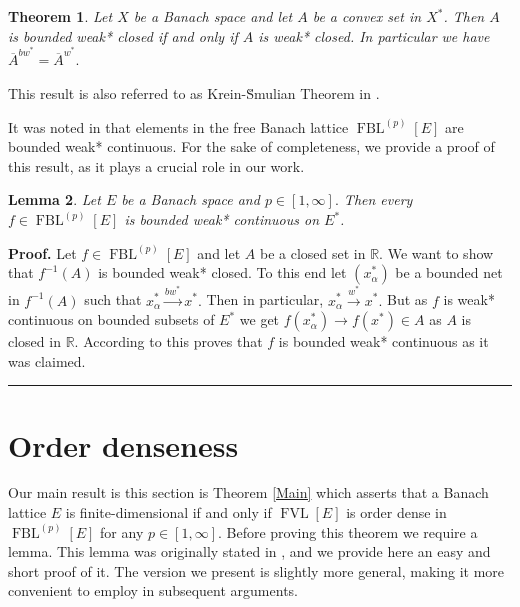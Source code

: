 \documentclass[12pt]{article}%
\newtheorem{theorem}{Theorem}
\newtheorem{lemma}[theorem]{Lemma}
\newenvironment{proof}[1][Proof]{\noindent\textbf{#1.} }{\ \rule{0.5em}{0.5em}}
\begin{document}
\begin{theorem}
\label{BD}Let $X$ be a Banach space \textit{and let} $A$ \textit{be a convex
set in} $X^{\ast}$. Then $A$ is bounded weak* closed if and only if $A$ is
weak* closed.\textit{ In particular we have }$\overline{A}^{bw^{\ast}%
}=\overline{A}^{w^{\ast}}.$
\end{theorem}

This result is also referred to as Krein-\u{S}mulian Theorem in
\cite[Corollary 8.47]{b-1901}.

It was noted in \cite{L-925} that elements in the free Banach lattice
$\operatorname*{FBL}\nolimits^{(p)}\left[  E\right]  $ are bounded weak*
continuous. For the sake of completeness, we provide a proof of this result,
as it plays a crucial role in our work.

\begin{lemma}
Let $E$ be a Banach space and $p\in\left[  1,\infty\right]  .$ Then every
$f\in\operatorname*{FBL}\nolimits^{(p)}\left[  E\right]  $ is bounded weak*
continuous on $E^{\ast}$.
\end{lemma}

\begin{proof}
Let $f\in\operatorname*{FBL}\nolimits^{(p)}\left[  E\right]  $ and let $A$ be
a closed set in $\mathbb{R}.$ We want to show that $f^{-1}\left(  A\right)  $
is bounded weak* closed. To this end let $\left(  x_{\alpha}^{\ast}\right)  $
be a bounded net in $f^{-1}\left(  A\right)  $ such that $x_{\alpha}^{\ast
}\overset{bw^{\ast}}{\longrightarrow}x^{\ast}.$ Then in particular,
$x_{\alpha}^{\ast}\overset{w^{\ast}}{\longrightarrow}x^{\ast}.$ But as $f$ is
weak* continuous on bounded subsets of $E^{\ast}$ we get $f\left(  x_{\alpha
}^{\ast}\right)  \longrightarrow f\left(  x^{\ast}\right)  \in A$ as $A$ is
closed in $\mathbb{R}$. According to \cite[Lemma 2.7.5]{b-2554} this proves
that $f$ is bounded weak* continuous as it was claimed.
\end{proof}

\section{Order denseness}

Our main result is this section is Theorem \ref{Main} which asserts that a
Banach lattice $E$ is finite-dimensional if and only if $\operatorname*{FVL}%
\left[  E\right]  $ is order dense in $\operatorname*{FBL}\nolimits^{(p)}%
\left[  E\right]  $ for any $p\in\left[  1,\infty\right]  .$ Before proving
this theorem we require a lemma. This lemma was originally stated in
\cite{L-925}, and we provide here an easy and short proof of it. The version
we present is slightly more general, making it more convenient to employ in
subsequent arguments.
\end{document}
